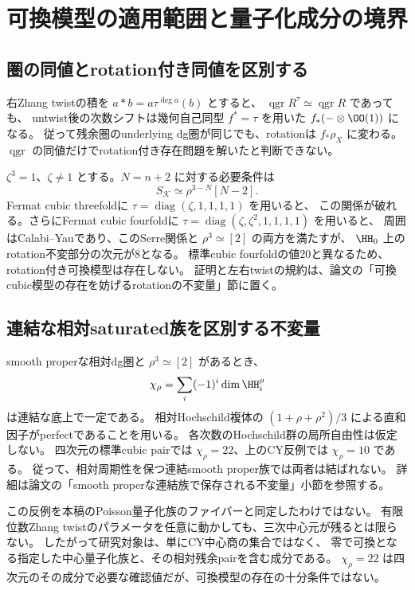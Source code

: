 \section{可換模型の適用範囲と量子化成分の境界}
\label{sec:notes-model-boundary}

\subsection{圏の同値とrotation付き同値を区別する}

右Zhang twistの積を \(a*b=a\tau^{\deg a}(b)\) とすると、
\(\operatorname{qgr}R^\tau\simeq\operatorname{qgr}R\) であっても、
untwist後の次数シフトは幾何自己同型 \(f^*=\tau\) を用いた
\(f_*(-\otimes\OO(1))\) になる。
従って残余圏のunderlying dg圏が同じでも、rotationは \(f_*\rho_X\) に変わる。
\(\operatorname{qgr}\) の同値だけでrotation付き存在問題を解いたと判断できない。

\(\zeta^3=1\)、\(\zeta\ne1\) とする。\(N=n+2\) に対する必要条件は
\[
 S_{\mathcal K}\simeq\rho^{3-N}[N-2].
\]
Fermat cubic threefoldに \(\tau=\operatorname{diag}(\zeta,1,1,1,1)\) を用いると、
この関係が破れる。さらにFermat cubic fourfoldに
\(\tau=\operatorname{diag}(\zeta,\zeta^2,1,1,1,1)\) を用いると、
周囲はCalabi--Yauであり、このSerre関係と \(\rho^3\simeq[2]\) の両方を満たすが、
\(\HH_0\) 上のrotation不変部分の次元が8となる。
標準cubic fourfoldの値20と異なるため、rotation付き可換模型は存在しない。
証明と左右twistの規約は、論文の「可換cubic模型の存在を妨げるrotationの不変量」節に置く。

\subsection{連結な相対saturated族を区別する不変量}

smooth properな相対dg圏と \(\rho^3\simeq[2]\) があるとき、
\[
 \chi_\rho=\sum_i(-1)^i\dim\HH_i^{\rho}
\]
は連結な底上で一定である。
相対Hochschild複体の \((1+\rho+\rho^2)/3\) による直和因子がperfectであることを用いる。
各次数のHochschild群の局所自由性は仮定しない。
四次元の標準cubic pairでは \(\chi_\rho=22\)、上のCY反例では \(\chi_\rho=10\) である。
従って、相対周期性を保つ連結smooth proper族では両者は結ばれない。
詳細は論文の「smooth properな連結族で保存される不変量」小節を参照する。

この反例を本稿のPoisson量子化族のファイバーと同定したわけではない。
有限位数Zhang twistのパラメータを任意に動かしても、三次中心元が残るとは限らない。
したがって研究対象は、単にCY中心商の集合ではなく、
零で可換となる指定した中心量子化族と、その相対残余pairを含む成分である。
\(\chi_\rho=22\) は四次元のその成分で必要な確認値だが、可換模型の存在の十分条件ではない。

